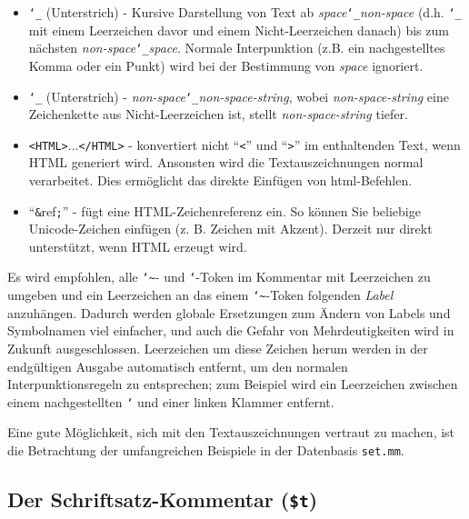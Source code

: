 \begin{itemize}
 \item[]
         \texttt{\char`\_} (Unterstrich) -
             Kursive Darstellung von Text ab {\em space}\texttt{\char`\_}{\em non-space} (d.h. \texttt{\char`\_} mit einem Leerzeichen davor und einem Nicht-Leerzeichen danach) bis zum nächsten {\em non-space}\texttt{\char`\_}{\em space}.  Normale Interpunktion (z.B. ein nachgestelltes Komma oder ein Punkt) wird bei der Bestimmung von {\em space} ignoriert.
 \item[]
         \texttt{\char`\_} (Unterstrich) - {\em
         non-space}\texttt{\char`\_}{\em non-space-string}, wobei
          {\em non-space-string} eine Zeichenkette aus Nicht-Leerzeichen ist, stellt {\em non-space-string} tiefer.
 \item[]
         \texttt{<HTML>}...\texttt{</HTML>} - konvertiert nicht "`\texttt{<}"' und "`\texttt{>}"' im enthaltenden Text, wenn {\sc HTML} generiert wird. Ansonsten wird die Textauszeichnungen normal verarbeitet. Dies ermöglicht das direkte Einfügen von {\sc html}-Befehlen.
 \item[]
       "`\texttt{\&}ref\texttt{;}"' - fügt eine {\sc HTML}-Zeichenreferenz ein. So können Sie beliebige Unicode-Zeichen einfügen (z. B. Zeichen mit Akzent).  Derzeit nur direkt unterstützt, wenn {\sc HTML} erzeugt wird.
\end{itemize}

Es wird empfohlen, alle \texttt{\char`\~}- und \texttt{`}-Token im Kommentar mit Leerzeichen zu umgeben und ein Leerzeichen an das einem \texttt{\char`\~}-Token folgenden {\em Label} anzuhängen.  Dadurch werden globale Ersetzungen zum Ändern von Labels und Symbolnamen viel einfacher, und auch die Gefahr von Mehrdeutigkeiten wird in Zukunft ausgeschlossen.  Leerzeichen um diese Zeichen herum werden in der endgültigen Ausgabe automatisch entfernt, um den normalen Interpunktionsregeln zu entsprechen; zum Beispiel wird ein Leerzeichen zwischen einem nachgestellten \texttt{`} und einer linken Klammer entfernt.

Eine gute Möglichkeit, sich mit den Textauszeichnungen vertraut zu machen, ist die Betrachtung der umfangreichen Beispiele in der Datenbasis \texttt{set.mm}.

\subsection{Der Schriftsatz-Kommentar (\texttt{\$t})}\label{tcomment}

